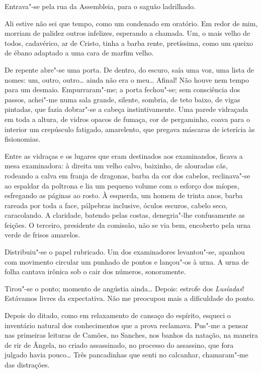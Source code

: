 Entrava"-se pela rua da Assembleia, para o saguão ladrilhado. 

Ali estive não sei que tempo, como um condenado em
oratório. Em redor de mim, morriam de palidez outros infelizes,
esperando a chamada. Um, o mais velho de todos, cadavérico, ar de
Cristo, tinha a barba rente, pretíssima, como um queixo de ébano
adaptado a uma cara de marfim velho. 

De repente abre"-se uma porta. De
dentro, do escuro, saía uma voz, uma lista de nomes: um, outro,
outro\ldots{} ainda não era o meu\ldots{} Afinal! Não houve nem tempo para um
desmaio. Empurraram"-me; a porta fechou"-se; sem consciência dos
passos, achei"-me numa sala grande, silente, sombria, de teto baixo,
de vigas pintadas, que fazia dobrar"-se a cabeça instintivamente. Uma
parede vidraçada em toda a altura, de vidros opacos de fumaça, cor de
pergaminho, coava para o interior um crepúsculo fatigado, amarelento,
que pregava máscaras de icterícia às fisionomias. 

Entre as vidraças e
os lugares que eram destinados aos examinandos, ficava a mesa
examinadora: à direita um velho calvo, baixinho, de alouradas cãs,
rodeando a calva em franja de dragonas, barba da cor dos cabelos,
reclinava"-se ao espaldar da poltrona e lia um pequeno volume com o
esforço dos míopes, esfregando as páginas ao rosto. À esquerda, um
homem de trinta anos, barba rareada por toda a face, pálpebras
inclusive, óculos escuros, cabelo seco, caracolando. A claridade,
batendo pelas costas, denegria"-lhe confusamente as feições. O
terceiro, presidente da comissão, não se via bem, encoberto pela urna
verde de frisos amarelos. 

Distribuiu"-se o papel rubricado. Um dos
examinadores levantou"-se, apanhou com movimento circular um punhado
de pontos e lançou"-os à urna. A urna de folha cantava irônica sob o
cair dos números, sonoramente. 

Tirou"-se o ponto; momento de angústia
ainda\ldots{} Depois: estrofe dos \textit{Lusíadas}! Estávamos livres da expectativa.
Não me preocupou mais a dificuldade do ponto. 


Depois do ditado, como em
relaxamento de cansaço do espírito, esqueci o inventário natural dos
conhecimentos que a prova reclamava. Pus"-me a pensar nas primeiras
leituras de Camões, no Sanches, nos banhos da natação, na maneira de
rir de Ângela, no criado assassinado, no processo do assassino, que
fora julgado havia pouco\ldots{} Três pancadinhas que senti no calcanhar,
chamaram"-me das distrações. 

